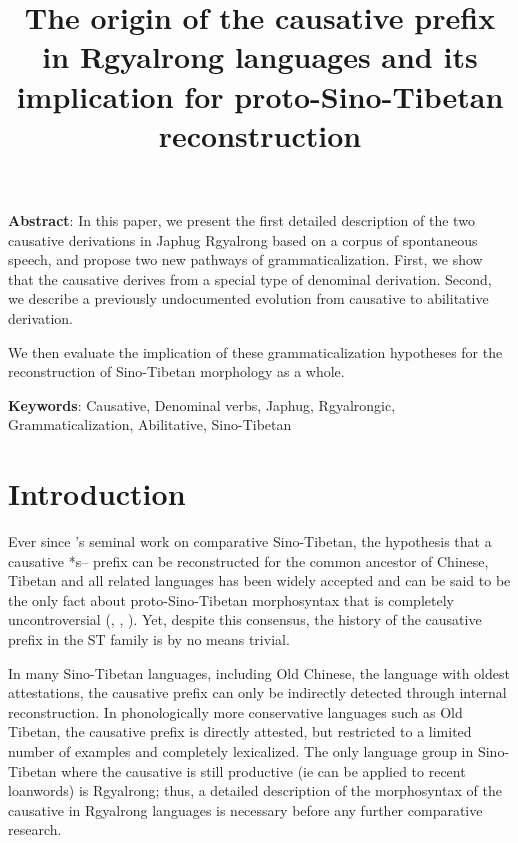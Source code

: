 \documentclass[oldfontcommands,oneside,a4paper,11pt]{article}
\begin{document}
 
\linenumbers
\title{The origin of the causative prefix in Rgyalrong languages and its implication for proto-Sino-Tibetan reconstruction}
\maketitle

\textbf{Abstract}: In this paper, we present the first detailed description of the two causative derivations in Japhug Rgyalrong based on a corpus of spontaneous speech, and propose two new pathways of grammaticalization. First, we show that the causative derives from a special type of denominal derivation. Second, we describe a previously undocumented evolution from causative to abilitative derivation. 

We then evaluate the implication of these grammaticalization hypotheses for the reconstruction of Sino-Tibetan morphology as a whole.

\textbf{Keywords}: Causative, Denominal verbs, Japhug, Rgyalrongic, Grammaticalization, Abilitative, Sino-Tibetan

\section{Introduction}

Ever since \citet{conrady1896}'s seminal work on comparative Sino-Tibetan, the hypothesis that a causative *s-- prefix can be reconstructed for the  common ancestor of Chinese, Tibetan and all related languages has been widely accepted and can be said to be the only fact about proto-Sino-Tibetan morphosyntax that is completely uncontroversial (\citealt{benedict72}, \citealt{matisoff03}, \citealt{lapolla03}).  Yet, despite this consensus, the history of the causative prefix in the ST family is by no means trivial. 

In many Sino-Tibetan languages, including Old Chinese, the  language with oldest attestations, the causative prefix can only be indirectly detected through internal reconstruction. In  phonologically more conservative languages such as Old Tibetan, the causative prefix is directly attested, but restricted to a limited number of examples and completely lexicalized. The only language group in Sino-Tibetan where the causative is still productive (ie can be applied to recent loanwords) is Rgyalrong; thus, a detailed description of the morphosyntax of the causative in Rgyalrong languages is necessary before any further comparative research.
\end{document}
